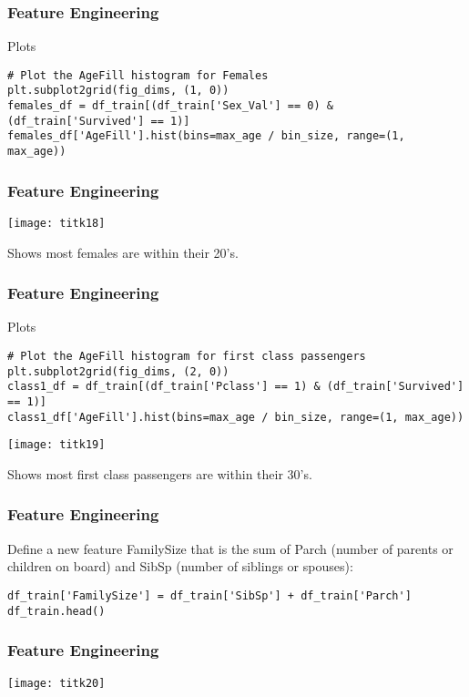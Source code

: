 \begin{frame}[fragile]\frametitle{Feature Engineering}
Plots
\begin{lstlisting}
# Plot the AgeFill histogram for Females
plt.subplot2grid(fig_dims, (1, 0))
females_df = df_train[(df_train['Sex_Val'] == 0) & (df_train['Survived'] == 1)]
females_df['AgeFill'].hist(bins=max_age / bin_size, range=(1, max_age))
\end{lstlisting}

\end{frame}

\begin{frame}[fragile]\frametitle{Feature Engineering}
\begin{center}
\texttt{[image: titk18]}
\end{center}
Shows most females are within their 20's.
\end{frame}


\begin{frame}[fragile]\frametitle{Feature Engineering}
Plots
\begin{lstlisting}
# Plot the AgeFill histogram for first class passengers
plt.subplot2grid(fig_dims, (2, 0))
class1_df = df_train[(df_train['Pclass'] == 1) & (df_train['Survived'] == 1)]
class1_df['AgeFill'].hist(bins=max_age / bin_size, range=(1, max_age))
\end{lstlisting}
\begin{center}
\texttt{[image: titk19]}
\end{center}
Shows most first class passengers are within their 30's.
\end{frame}



\begin{frame}[fragile]\frametitle{Feature Engineering}
Define a new feature FamilySize that is the sum of Parch (number of parents or children on board) and SibSp (number of siblings or spouses):
\begin{lstlisting}
df_train['FamilySize'] = df_train['SibSp'] + df_train['Parch']
df_train.head()
\end{lstlisting}

\end{frame}


\begin{frame}[fragile]\frametitle{Feature Engineering}
\begin{center}
\texttt{[image: titk20]}
\end{center}
\end{frame}

